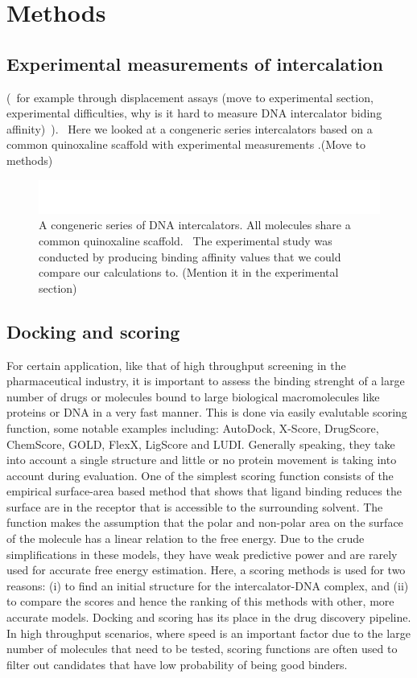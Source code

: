\chapter{Methods}

\section{Experimental measurements of intercalation}

(~for example through displacement assays (move to experimental section, experimental difficulties, why is it hard to measure DNA intercalator biding affinity)~). ~Here we looked at a congeneric series intercalators based on a common quinoxaline scaffold with experimental measurements \cite{}.(Move to methods)~

\begin{figure}[h]
	\includegraphics[width=\textwidth]{intercalators.pdf}
	\caption{A congeneric series of DNA intercalators. All molecules share a common quinoxaline scaffold. ~The experimental study was conducted by \cite{} producing binding affinity values that we could compare our calculations to. (Mention it in the experimental section)~ }
	\label{fig:intercalators}
\end{figure}


\section{Docking and scoring}

For certain application, like that of high throughput screening in the pharmaceutical industry, it is important to assess the binding strenght of a large number of drugs or molecules bound to large biological macromolecules like proteins or DNA in a very fast manner. This is done via easily evalutable scoring function, some notable examples including: AutoDock, X-Score, DrugScore, ChemScore, GOLD, FlexX, LigScore and LUDI. Generally speaking, they take into account a single structure and little or no protein movement is taking into account during evaluation. One of the simplest scoring function  consists of the empirical surface-area based method that shows that ligand binding reduces the surface are in the receptor that is accessible to the surrounding solvent. The function makes the assumption that the polar and non-polar area on the surface of the molecule has a linear relation to the free energy. Due to the crude simplifications in these models, they have weak predictive power and are rarely used for accurate free energy estimation. Here, a scoring methods is used for two reasons: (i) to find an initial structure for the intercalator-DNA complex, and (ii) to compare the scores and hence the ranking of this methods with other, more accurate models. Docking and scoring has its place in the drug discovery pipeline. In high throughput scenarios, where speed is an important factor due to the large number of molecules that need to be tested, scoring functions are often used to filter out candidates that have low probability of being good binders.

